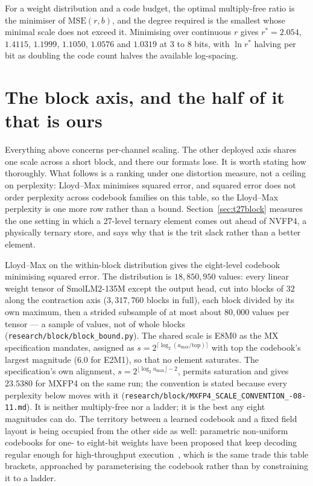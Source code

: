 \begin{theorem}\label{thm:optratio}
For a weight distribution and a code budget, the optimal multiply-free ratio is
the minimiser of $\mathrm{MSE}(r,b)$, and the degree required is the smallest
whose minimal scale does not exceed it. Minimising over continuous $r$ gives
$r^{*}=2.054$, $1.4115$, $1.1999$, $1.1050$, $1.0576$ and $1.0319$ at $3$ to
$8$ bits,
with $\ln r^{*}$ halving per bit as doubling the code count halves the available
log-spacing.
\end{theorem}

\section{The block axis, and the half of it that is ours}
\label{sec:blockbound}

Everything above concerns per-channel scaling. The other deployed axis shares
one scale across a short block, and there our formats lose. It is worth stating
how thoroughly. What follows is a ranking under one distortion measure, not a ceiling on perplexity: Lloyd--Max minimises squared error, and squared error does not order perplexity across codebook families on this table, so the Lloyd--Max perplexity is one more row rather than a bound. Section~\ref{sec:t27block} measures the one setting in which a 27-level ternary element comes out ahead of NVFP4, a physically ternary store, and says why that is the trit slack rather than a better element.

Lloyd--Max on the within-block distribution gives the eight-level codebook minimising squared error. The distribution is $18{,}850{,}950$ values: every linear weight tensor of SmolLM2-135M except the output head, cut into blocks of $32$ along the contraction axis ($3{,}317{,}760$ blocks in full), each block divided by its own maximum, then a strided subsample of at most about $80{,}000$ values per tensor --- a sample of values, not of whole blocks (\texttt{research/\allowbreak block/\allowbreak block\_\allowbreak bound.py}). The shared scale is E8M0 as the MX specification mandates, assigned as $s=2^{\lceil\log_2(a_{\max}/\mathrm{top})\rceil}$ with $\mathrm{top}$ the codebook's largest magnitude ($6.0$ for E2M1), so that no element saturates. The specification's own alignment, $s=2^{\lfloor\log_2 a_{\max}\rfloor-2}$, permits saturation and gives $23.5380$ for MXFP4 on the same run; the convention is stated because every perplexity below moves with it (\texttt{research/\allowbreak block/\allowbreak MXFP4\_\allowbreak SCALE\_\allowbreak CONVENTION\_-08-11.md}). It is
neither multiply-free nor a ladder; it is the best any eight magnitudes can do.
The territory between a learned codebook and a fixed field layout is being
occupied from the other side as well: parametric non-uniform codebooks for one- to
eight-bit weights have been proposed that keep decoding regular enough for
high-throughput execution~\cite{gao2026cubicquant}, which is the same trade this
table brackets, approached by parameterising the codebook rather than by
constraining it to a ladder.

